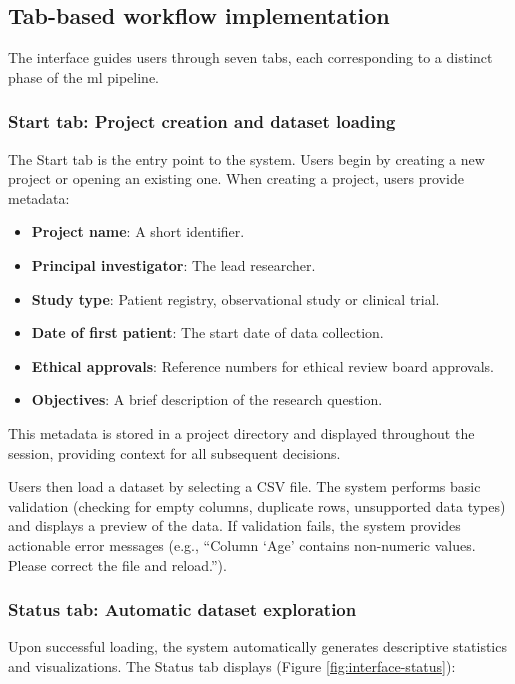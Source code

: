 \documentclass[twoside,final]{Contexto}
\begin{document}
\subsection{Tab-based workflow implementation}

The interface guides users through seven tabs, each corresponding to a distinct phase of the \gls{ml} pipeline.

\subsubsection{Start tab: Project creation and dataset loading}

The Start tab is the entry point to the system. Users begin by creating a new project or opening an existing one. When creating a project, users provide metadata:

\begin{itemize}
    \item \textbf{Project name}: A short identifier.
    \item \textbf{Principal investigator}: The lead researcher.
    \item \textbf{Study type}: Patient registry, observational study or clinical trial.
    \item \textbf{Date of first patient}: The start date of data collection.
    \item \textbf{Ethical approvals}: Reference numbers for ethical review board approvals.
    \item \textbf{Objectives}: A brief description of the research question.
\end{itemize}

This metadata is stored in a project directory and displayed throughout the session, providing context for all subsequent decisions.

Users then load a dataset by selecting a CSV file. The system performs basic validation (checking for empty columns, duplicate rows, unsupported data types) and displays a preview of the data. If validation fails, the system provides actionable error messages (e.g., ``Column `Age' contains non-numeric values. Please correct the file and reload.'').

\subsubsection{Status tab: Automatic dataset exploration}

Upon successful loading, the system automatically generates descriptive statistics and visualizations. The Status tab displays (Figure \ref{fig:interface-status}):
\end{document}
